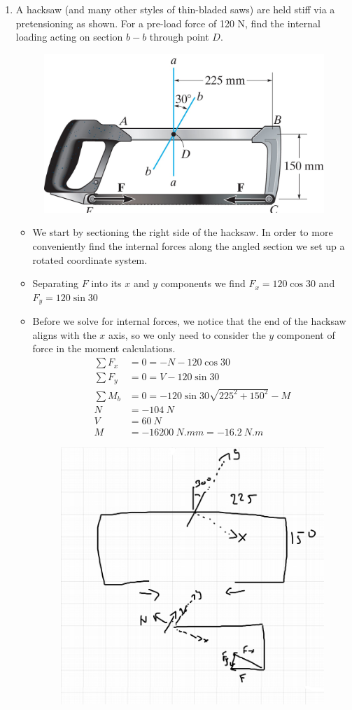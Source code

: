 \documentclass[12pt, oneside]{article}
\begin{document}
\begin{enumerate}
	\item %
		A hacksaw (and many other styles of thin-bladed saws) are held stiff via a pretensioning as shown.
		For a pre-load force of 120 N, find the internal loading acting on section $b-b$ through point $D$.
		\begin{figure}[H]
			\centering
			\includegraphics[width=0.6\linewidth]{hacksaw}
			\label{fig:hacksaw}
		\end{figure}
		\begin{itemize}
			\item We start by sectioning the right side of the hacksaw. In order to more conveniently find the internal forces along the angled section we set up a rotated coordinate system.
			\item Separating $F$ into its $x$ and $y$ components we find $F_x = 120 \cos 30$ and $F_y = 120 \sin 30$
			\item Before we solve for internal forces, we notice that the end of the hacksaw aligns with the $x$ axis, so we only need to consider the $y$ component of force in the moment calculations.
			\begin{align*}
				\sum F_x &= 0 = -N - 120 \cos 30 \\
				\sum F_y &= 0 = V - 120 \sin 30 \\
        \sum M_b &= 0 = -120 \sin 30 \sqrt{225^2+150^2}- M\\
				N &= \SI{-104}{N}\\
				V &= \SI{60}{N}\\
        M &= \SI{-16200}{N.mm} = \SI{-16.2}{N.m}
			\end{align*}
			\begin{figure}[H]
				\centering
				\includegraphics[width=0.7\linewidth]{hw1-2}
			\end{figure}
		\end{itemize}


\end{enumerate}
\end{document}
